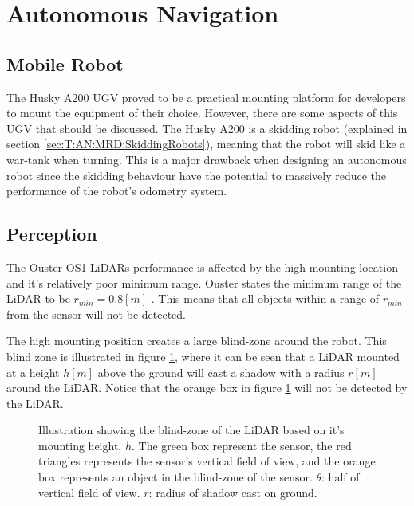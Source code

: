 \section{Autonomous Navigation} \label{sec:D:AutonomousNavigaion}

\subsection{Mobile Robot} \label{sec:D:AN:MobileRobot}
The Husky A200 UGV proved to be a practical mounting platform for developers to mount the equipment of their choice. However, there are some aspects of this UGV that should be discussed. The Husky A200 is a skidding robot (explained in section \ref{sec:T:AN:MRD:SkiddingRobots}), meaning that the robot will skid like a war-tank when turning. This is a major drawback when designing an autonomous robot since the skidding behaviour have the potential to massively reduce the performance of the robot's odometry system.

\subsection{Perception} \label{sec:D:AN:Perception}
The Ouster OS1 LiDARs performance is affected by the high mounting location and it's relatively poor minimum range. Ouster states the minimum range of the LiDAR to be $r_{min}=0.8[m]$ \cite{OS1_datasheet}. This means that all objects within a range of $r_{min}$ from the sensor will not be detected.

The high mounting position creates a large blind-zone around the robot. This blind zone is illustrated in figure \ref{fig:D:AN:P:LidarShadow}, where it can be seen that a LiDAR mounted at a height $h[m]$ above the ground will cast a shadow with a radius $r[m]$ around the LiDAR. Notice that the orange box in figure \ref{fig:D:AN:P:LidarShadow} will not be detected by the LiDAR.

\begin{figure}[ht]
  \centering
  
  \caption{Illustration showing the blind-zone of the LiDAR based on it's mounting height, $h$. The green box represent the sensor, the red triangles represents the sensor's vertical field of view, and the orange box represents an object in the blind-zone of the sensor. $\theta$: half of vertical field of view. $r$: radius of shadow cast on ground.}
  \label{fig:D:AN:P:LidarShadow}
\end{figure}

